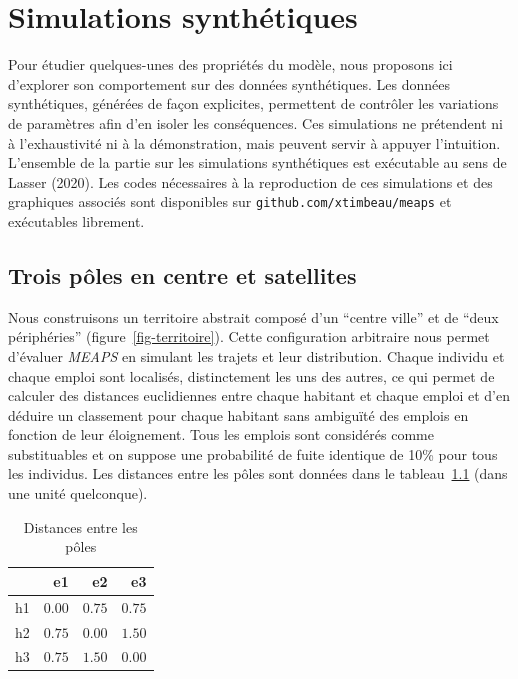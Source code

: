 \documentclass[
  10pt,
  a4paper,
  numbers=noendperiod,
  DIV=9]{scrartcl}
\begin{document}
\hypertarget{sec-synt}{%
\chapter{Simulations synthétiques}\label{sec-synt}}

Pour étudier quelques-unes des propriétés du modèle, nous proposons ici
d'explorer son comportement sur des données synthétiques. Les données
synthétiques, générées de façon explicites, permettent de contrôler les
variations de paramètres afin d'en isoler les conséquences. Ces
simulations ne prétendent ni à l'exhaustivité ni à la démonstration,
mais peuvent servir à appuyer l'intuition. L'ensemble de la partie sur
les simulations synthétiques est exécutable au sens de Lasser (2020).
Les codes nécessaires à la reproduction de ces simulations et des
graphiques associés sont disponibles sur
\texttt{github.com/xtimbeau/meaps} et exécutables librement.

\hypertarget{sec-3p2s}{%
\section{Trois pôles en centre et satellites}\label{sec-3p2s}}

Nous construisons un territoire abstrait composé d'un ``centre ville''
et de ``deux périphéries'' (figure~\ref{fig-territoire}). Cette
configuration arbitraire nous permet d'évaluer \emph{MEAPS} en simulant
les trajets et leur distribution. Chaque individu et chaque emploi sont
localisés, distinctement les uns des autres, ce qui permet de calculer
des distances euclidiennes entre chaque habitant et chaque emploi et
d'en déduire un classement pour chaque habitant sans ambiguïté des
emplois en fonction de leur éloignement. Tous les emplois sont
considérés comme substituables et on suppose une probabilité de fuite
identique de 10\% pour tous les individus. Les distances entre les pôles
sont données dans le tableau~\ref{tbl-distances} (dans une unité
quelconque).

\hypertarget{tbl-distances}{}
\begin{longtable}{lrrr}
\caption{\label{tbl-distances}Distances entre les pôles }\tabularnewline

\toprule
 & e1 & e2 & e3 \\ 
\midrule
h1 & $0.00$ & $0.75$ & $0.75$ \\ 
h2 & $0.75$ & $0.00$ & $1.50$ \\ 
h3 & $0.75$ & $1.50$ & $0.00$ \\ 
\bottomrule
\end{longtable}
\end{document}
